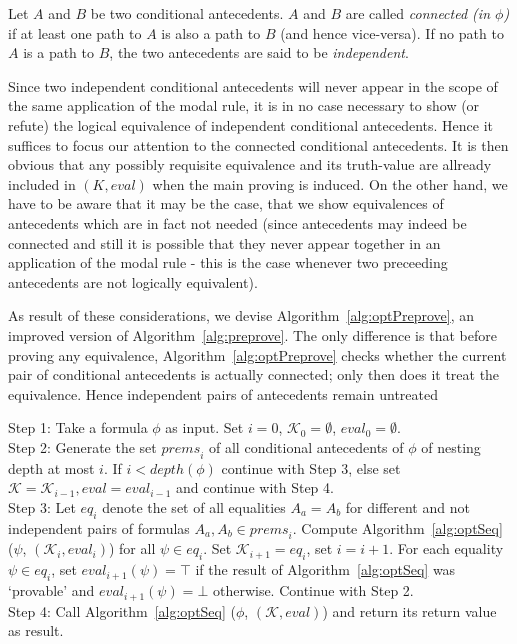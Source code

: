 \documentclass{entcs} \usepackage{entcsmacro}
\newcommand{\prems}{\mathit{prems}}
\newcommand{\eval}{\mathit{eval}}
\begin{document}
\begin{definition}
Let $A$ and $B$ be two conditional antecedents. $A$ and $B$ are called \emph{connected (in $\phi$)} if
at least one path to $A$ is also a path to $B$ (and hence vice-versa). If no path to $A$ is a path to $B$,
the two antecedents are said to be \emph{independent}.
\end{definition}

Since two independent conditional antecedents will never appear in the scope of the
same application of the modal rule, it is in no case necessary to show (or
refute) the logical equivalence of independent conditional antecedents. Hence it suffices to focus
our attention to the connected conditional antecedents. It is then obvious that
any possibly requisite equivalence and its truth-value are allready included in $(K,\eval)$
when the main proving is induced. On the other hand, we have to be aware that it
may be the case, that we show equivalences of antecedents which are in fact not needed
(since antecedents may indeed be connected and still it is possible that they never appear together in an application
of the modal rule - this is the case whenever two preceeding antecedents are not logically equivalent).

As result of these considerations, we devise Algorithm~\ref{alg:optPreprove},
an improved version of Algorithm~\ref{alg:preprove}. The only difference is
that before proving any equivalence, Algorithm~\ref{alg:optPreprove} checks
whether the current pair of conditional antecedents is actually connected;
only then does it treat the equivalence. Hence independent pairs of antecedents
remain untreated
\begin{alg}
\begin{upshape}
  Step 1: Take a formula $\phi$ as input. Set $i=0$, $\mathcal{K}_0=\emptyset$, $\eval_0=\emptyset$.\\
  Step 2: Generate the set $\prems_i$ of all conditional antecedents of $\phi$
  of nesting depth at most $i$. If $i<depth(\phi)$ continue
  with Step 3, else set $\mathcal{K}=\mathcal{K}_{i-1}, \eval=\eval_{i-1}$ and continue with Step 4.\\
  Step 3: Let $eq_i$ denote the set of all equalities $A_a = A_b$ for different and not independent
  pairs of formulas $A_a,A_b\in \prems_i$. Compute
  Algorithm~\ref{alg:optSeq} ($\psi$, $(\mathcal{K}_i,\eval_i)$) for all $\psi\in eq_i$.
  Set $\mathcal{K}_{i+1} = eq_i$, set $i = i + 1$. For each equality $\psi\in eq_i$,
  set $\eval_{i+1}(\psi)=\top$ if the result of Algorithm~\ref{alg:optSeq} was `provable'
  and $\eval_{i+1}(\psi)=\bot$ otherwise. Continue with Step 2.\\
  Step 4: Call Algorithm~\ref{alg:optSeq} ($\phi$, $(\mathcal{K},\eval)$) and return its 
  return value as result.
\label{alg:optPreprove}
\end{upshape}
\end{alg}
\end{document}

